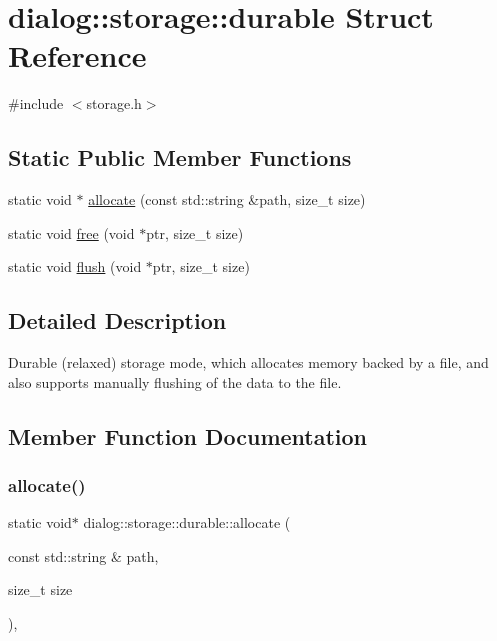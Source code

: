 \hypertarget{structdialog_1_1storage_1_1durable}{}\section{dialog\+:\+:storage\+:\+:durable Struct Reference}
\label{structdialog_1_1storage_1_1durable}


{\ttfamily \#include $<$storage.\+h$>$}

\subsection*{Static Public Member Functions}
\begin{DoxyCompactItemize}
\item 
static void $\ast$ \hyperlink{structdialog_1_1storage_1_1durable_ae22bc38ef79ba261079d36af562200fb}{allocate} (const std\+::string \&path, size\+\_\+t size)
\item 
static void \hyperlink{structdialog_1_1storage_1_1durable_a4fe38b9ca53b3cb89d53e5343f813db9}{free} (void $\ast$ptr, size\+\_\+t size)
\item 
static void \hyperlink{structdialog_1_1storage_1_1durable_a1ea22279109b5b06d195aadfe5594ef4}{flush} (void $\ast$ptr, size\+\_\+t size)
\end{DoxyCompactItemize}


\subsection{Detailed Description}
Durable (relaxed) storage mode, which allocates memory backed by a file, and also supports manually flushing of the data to the file. 

\subsection{Member Function Documentation}
\mbox{\label{structdialog_1_1storage_1_1durable_ae22bc38ef79ba261079d36af562200fb}} 
\subsubsection{\texorpdfstring{allocate()}{allocate()}}
{\footnotesize\ttfamily static void$\ast$ dialog\+::storage\+::durable\+::allocate (\begin{DoxyParamCaption}\item[{const std\+::string \&}]{path,  }\item[{size\+\_\+t}]{size }\end{DoxyParamCaption})\hspace{0.3cm}{\ttfamily [inline]}, {\ttfamily [static]}}

